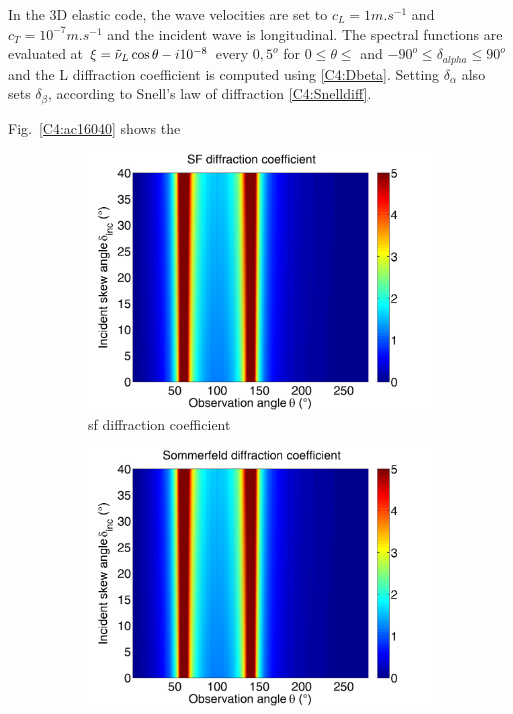 In the 3D elastic code, the wave velocities are set to $c_L=1 m.s^{-1}$ and $c_T=10^{-7} m.s^{-1}$ and the incident wave is longitudinal. The spectral functions are evaluated at $\xi=\tilde{\nu}_L\cos\theta -i10^{-8}$ every $0,5^o$ for $0\leq\theta\leq$ and $-90^o\leq \delta_{alpha} \leq 90^o$ and the L diffraction coefficient is computed using \eqref{C4:Dbeta}. Setting $\delta_{\alpha}$ also sets $\delta_{\beta}$, according to Snell's law of diffraction \eqref{C4:Snelldiff}.

Fig.~\ref{C4:ac16040} shows the

\begin{figure}
\centering
\begin{subfigure}[b]{0.49\textwidth}
        \includegraphics[width=\textwidth]{images/chapter4/Xprop_280_239.png}
        \caption{\acrshort{sf} diffraction coefficient}
        \label{C4:ac280240}
    \end{subfigure}
\begin{subfigure}[b]{0.49\textwidth}
        \includegraphics[width=\textwidth]{images/chapter4/Sommerfeld_280_239.png}

\end{subfigure}
\end{figure}
